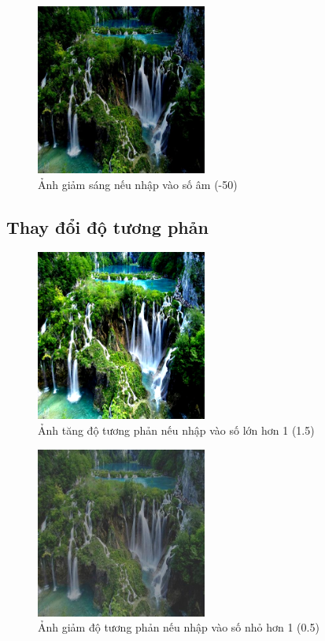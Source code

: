 \begin{figure}[H]
	\centering
	\includegraphics[width=0.5\textwidth]{images/res/512_bright_desc.jpg}
	\caption{Ảnh giảm sáng nếu nhập vào số âm (-50)}
	\label{fig:dark}
\end{figure}

\subsection{Thay đổi độ tương phản}
\begin{figure}[H]
	\centering
	\includegraphics[width=0.5\textwidth]{images/res/512_contrast_asc.png}
	\caption{Ảnh tăng độ tương phản nếu nhập vào số lớn hơn 1 (1.5)}
	\label{fig:contrast_up}
\end{figure}

\begin{figure}[H]
	\centering
	\includegraphics[width=0.5\textwidth]{images/res/512_contrast_desc.jpg}
	\caption{Ảnh giảm độ tương phản nếu nhập vào số nhỏ hơn 1 (0.5)}
	\label{fig:contrast_down}
\end{figure}

